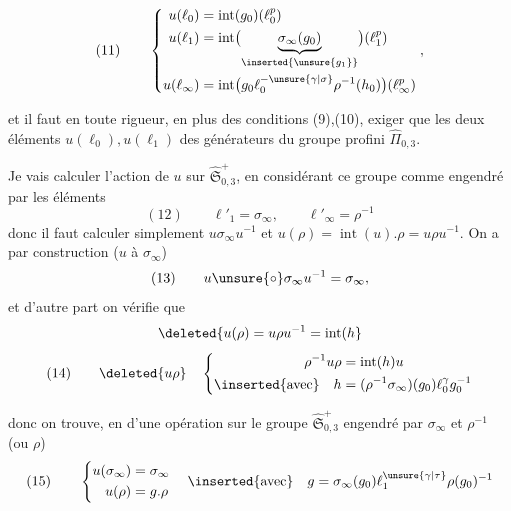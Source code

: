 
\[
(11)\qquad
\left\{
\begin{aligned}
u(\ell_0)&=\operatorname{int}(g_0)(\ell_0^p)\\
u(\ell_1)&=\operatorname{int}\bigl(\underbrace{\sigma_\infty(g_0)}_{\inserted{\unsure{g_1}}}\bigr)(\ell_1^p)\\
u(\ell_\infty)&=\operatorname{int}\bigl(g_0\ell_0^{-\unsure{\gamma|\sigma}}\rho^{-1}(h_0)\bigr)(\ell_\infty^p)
\end{aligned}
\right.,
\]

et il faut en toute rigueur, en plus des conditions (9),(10), exiger que les deux éléments $u(\ell_0),u(\ell_1)$   des générateurs du groupe profini $\widehat{\Pi}_{0,3}$.

Je vais calculer l'action de $u$ sur $\widehat{\mathfrak S}_{0,3}^{+}$, en considérant ce groupe comme engendré par les éléments
\[
(12)\qquad \ell'_1=\sigma_\infty,\qquad \ell'_\infty=\rho^{-1}
\]
donc il faut calculer simplement  $u\sigma_\infty u^{-1}$ et $u(\rho)=\operatorname{int}(u).\rho=u\rho u^{-1}$. On a par construction ($u$  à $\sigma_\infty$)
\[
(13)\qquad u\unsure{\circ}\sigma_\infty u^{-1}=\sigma_\infty,
\]
et d'autre part on vérifie que
\[
\deleted{u(\rho)=u\rho u^{-1}=\operatorname{int}(h}
\]
\[
(14)\qquad \deleted{u\rho}\quad
\left\{
\begin{aligned}
\rho^{-1}u\rho&=\operatorname{int}(h)u\\
\inserted{\text{avec}}\quad h&=(\rho^{-1}\sigma_\infty)(g_0)\ell_0^{\gamma}g_0^{-1}
\end{aligned}
\right.
\]

donc on trouve, en  d'une opération sur le groupe $\widehat{\mathfrak S}_{0,3}^{+}$ engendré par $\sigma_\infty$ et $\rho^{-1}$ (ou $\rho$)
\[
(15)\qquad
\left\{
\begin{aligned}
u(\sigma_\infty)&=\sigma_\infty\\
u(\rho)&=g.\rho
\end{aligned}
\right.
\quad\inserted{\text{avec}}\quad
 g=\sigma_\infty(g_0)\ell_1^{\unsure{\gamma|\tau}}\rho(g_0)^{-1}
\]

